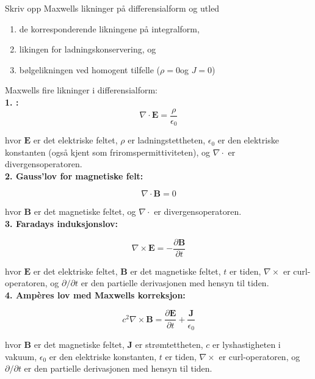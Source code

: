  Skriv opp Maxwells likninger på differensialform og utled

 \begin{enumerate}
    \item de korresponderende likningene på integralform,
    \item likingen for ladningskonservering, og 
    \item bølgelikningen ved homogent tilfelle ($\rho=0$og $J=0$)
 \end{enumerate}

Maxwells fire likninger i differensialform:
\\
\textbf{1. :}
\begin{equation*}
    \nabla \cdot \mathbf{E} = \frac{\rho}{\epsilon_0}
\end{equation*}

hvor $\mathbf{E}$ er det elektriske feltet, $\rho$ er ladningstettheten, $\epsilon_0$ er den elektriske konstanten (også kjent som friromspermittiviteten), og $\nabla \cdot$ er divergensoperatoren.
\\
\textbf{2. Gauss'lov for magnetiske felt:}

\begin{equation*}
    \nabla \cdot \mathbf{B} = 0
\end{equation*}

hvor $\mathbf{B}$ er det magnetiske feltet, og $\nabla \cdot$ er divergensoperatoren.
\\
\textbf{3. Faradays induksjonslov:}

\begin{equation*}
    \nabla \times \mathbf{E} = -\frac{\partial \mathbf{B}}{\partial t}
\end{equation*}

hvor $\mathbf{E}$ er det elektriske feltet, $\mathbf{B}$ er det magnetiske feltet, $t$ er tiden, $\nabla \times$ er curl-operatoren, og $\partial/\partial t$ er den partielle derivasjonen med hensyn til tiden.
\\
\textbf{4. Ampères lov med Maxwells korreksjon:}

\begin{equation*}
    c^{2} \nabla \times \mathbf{B}=\frac{\partial \mathbf{E}}{\partial t}+\frac{\mathbf{J}}{\epsilon_{0}}
\end{equation*}

hvor $\mathbf{B}$ er det magnetiske feltet, $\mathbf{J}$ er strømtettheten, $c$ er lyshastigheten i vakuum, $\epsilon_0$ er den elektriske konstanten, $t$ er tiden, $\nabla \times$ er curl-operatoren, og $\partial/\partial t$ er den partielle derivasjonen med hensyn til tiden.

